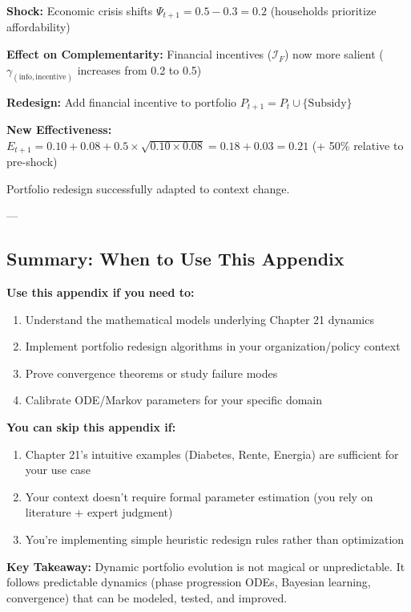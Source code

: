 \textbf{Shock:} Economic crisis shifts $\Psi_{t+1} = 0.5 - 0.3 = 0.2$ (households prioritize affordability)

\textbf{Effect on Complementarity:} Financial incentives ($\mathcal{I}_F$) now more salient ($\gamma_{(\text{info}, \text{incentive})} $ increases from 0.2 to 0.5)

\textbf{Redesign:} Add financial incentive to portfolio $P_{t+1} = P_t \cup \{\text{Subsidy}\}$

\textbf{New Effectiveness:} $E_{t+1} = 0.10 + 0.08 + 0.5 \times \sqrt{0.10 \times 0.08} = 0.18 + 0.03 = 0.21$ (+ 50\% relative to pre-shock)

Portfolio redesign successfully adapted to context change.

---

\subsection*{Summary: When to Use This Appendix}

\begin{tcolorbox}[colback=green!5!white, colframe=green!75!black, title=Appendix KKK Summary]

\textbf{Use this appendix if you need to:}
\begin{enumerate}
\item Understand the mathematical models underlying Chapter 21 dynamics
\item Implement portfolio redesign algorithms in your organization/policy context
\item Prove convergence theorems or study failure modes
\item Calibrate ODE/Markov parameters for your specific domain
\end{enumerate}

\textbf{You can skip this appendix if:}
\begin{enumerate}
\item Chapter 21's intuitive examples (Diabetes, Rente, Energia) are sufficient for your use case
\item Your context doesn't require formal parameter estimation (you rely on literature + expert judgment)
\item You're implementing simple heuristic redesign rules rather than optimization
\end{enumerate}

\textbf{Key Takeaway:} Dynamic portfolio evolution is not magical or unpredictable. It follows predictable dynamics (phase progression ODEs, Bayesian learning, convergence) that can be modeled, tested, and improved.

\end{tcolorbox}

